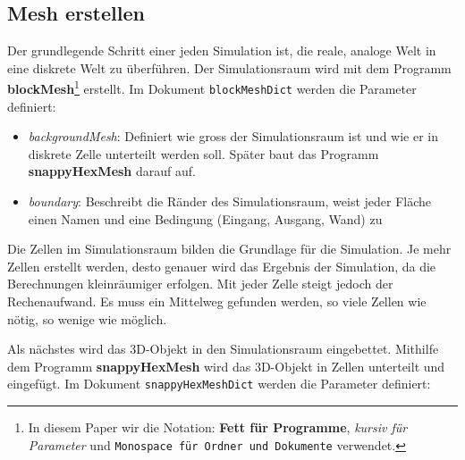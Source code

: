 \subsection{Mesh erstellen \label{openfoam:section:Mesh erstellen}}
Der grundlegende Schritt einer jeden Simulation ist, die reale, analoge Welt in eine diskrete Welt zu überführen.
Der Simulationsraum wird mit dem Programm \textbf{blockMesh}\footnote{In diesem Paper wir die Notation: \textbf{Fett für Programme}, \textit{kursiv für Parameter} und \texttt{Monospace für Ordner und Dokumente} verwendet.} 
erstellt.
Im Dokument \texttt{blockMeshDict} werden die Parameter definiert:

\begin{itemize}
    \item \textit{backgroundMesh}: Definiert wie gross der Simulationsraum ist und wie er in diskrete Zelle unterteilt werden soll. Später baut das Programm \textbf{snappyHexMesh} darauf auf.
    \item \textit{boundary}: Beschreibt die Ränder des Simulationsraum, weist jeder Fläche einen Namen und eine Bedingung (Eingang, Ausgang, Wand) zu
\end{itemize}
Die Zellen im Simulationsraum bilden die Grundlage für die Simulation. 
Je mehr Zellen erstellt werden, desto genauer wird das Ergebnis der Simulation, da die Berechnungen kleinräumiger erfolgen.
Mit jeder Zelle steigt jedoch der Rechenaufwand.
Es muss ein Mittelweg gefunden werden, so viele Zellen wie nötig, so wenige wie möglich.

Als nächstes wird das 3D-Objekt in den Simulationsraum eingebettet.
Mithilfe dem Programm \textbf{snappyHexMesh} wird das 3D-Objekt in  Zellen unterteilt und eingefügt. 
Im Dokument \texttt{snappyHexMeshDict} werden die Parameter definiert:

